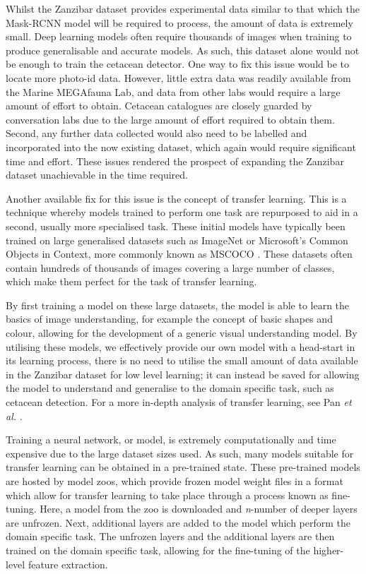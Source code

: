 Whilst the Zanzibar dataset provides experimental data similar to that which the Mask-RCNN model will be required to process, the amount of data is extremely small. Deep learning models often require thousands of images when training to produce generalisable and accurate models. As such, this dataset alone would not be enough to train the cetacean detector. One way to fix this issue would be to locate more photo-id data. However, little extra data was readily available from the Marine MEGAfauna Lab, and data from other labs would require a large amount of effort to obtain. Cetacean catalogues are closely guarded by conversation labs due to the large amount of effort required to obtain them. Second, any further data collected would also need to be labelled and incorporated into the now existing dataset, which again would require significant time and effort. These issues rendered the prospect of expanding the Zanzibar dataset unachievable in the time required. 

Another available fix for this issue is the concept of transfer learning. This is a technique whereby models trained to perform one task are repurposed to aid in a second, usually more specialised task. These initial models have typically been trained on large generalised datasets such as ImageNet \cite{deng_imagenet:_2009} or Microsoft's Common Objects in Context, more commonly known as MSCOCO \cite{lin_microsoft_2014}. These datasets often contain hundreds of thousands of images covering a large number of classes, which make them perfect for the task of transfer learning. 

By first training a model on these large datasets, the model is able to learn the basics of image understanding, for example the concept of basic shapes and colour, allowing for the development of a generic visual understanding model. By utilising these models, we effectively provide our own model with a head-start in its learning process, there is no need to utilise the small amount of data available in the Zanzibar dataset for low level learning; it can instead be saved for allowing the model to understand and generalise to the domain specific task, such as cetacean detection. For a more in-depth analysis of transfer learning, see Pan \textit{et al.} \cite{pan_survey_2010}.

Training a neural network, or model, is extremely computationally and time expensive due to the large dataset sizes used. As such, many models suitable for transfer learning can be obtained in a pre-trained state. These pre-trained models are hosted by model zoos, which provide frozen model weight files in a format which allow for transfer learning to take place through a process known as fine-tuning. Here, a model from the zoo is downloaded and \textit{n}-number of deeper layers are unfrozen. Next, additional layers are added to the model which perform the domain specific task. The unfrozen layers and the additional layers are then trained on the domain specific task, allowing for the fine-tuning of the higher-level feature extraction. 

